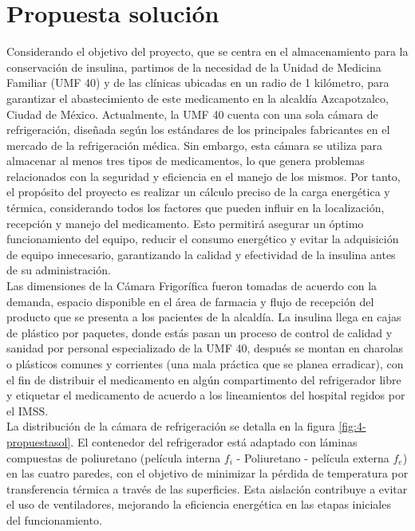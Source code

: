  
 \section{Propuesta solución}

 
Considerando el objetivo del proyecto, que se centra en el almacenamiento para la conservación de insulina, partimos de la necesidad de la Unidad de Medicina Familiar (UMF 40) y de las clínicas ubicadas en un radio de 1 kilómetro, para garantizar el abastecimiento de este medicamento en la alcaldía Azcapotzalco, Ciudad de México. Actualmente, la UMF 40 cuenta con una sola cámara de refrigeración, diseñada según los estándares de los principales fabricantes en el mercado de la refrigeración médica. Sin embargo, esta cámara se utiliza para almacenar al menos tres tipos de medicamentos, lo que genera problemas relacionados con la seguridad y eficiencia en el manejo de los mismos. Por tanto, el propósito del proyecto es realizar un cálculo preciso de la carga energética y térmica, considerando todos los factores que pueden influir en la localización, recepción y manejo del medicamento. Esto permitirá asegurar un óptimo funcionamiento del equipo, reducir el consumo energético y evitar la adquisición de equipo innecesario, garantizando la calidad y efectividad de la insulina antes de su administración.\\
Las dimensiones de la Cámara Frigorífica fueron tomadas de acuerdo con la demanda, espacio disponible en el área de farmacia y flujo de recepción del producto que se presenta a los pacientes de la alcaldía. La insulina llega en cajas de plástico por paquetes, donde estás pasan un proceso de control de calidad y sanidad por personal especializado de la UMF 40, después se montan en charolas o plásticos comunes y corrientes (una mala práctica que se planea erradicar), con el fin de distribuir el medicamento en algún compartimento del refrigerador libre y etiquetar el medicamento de acuerdo a los lineamientos del hospital regidos por el IMSS.\\
La distribución de la cámara de refrigeración se detalla en la figura \ref{fig:4-propuestasol}. El contenedor del refrigerador está adaptado con láminas compuestas de poliuretano (película interna $f_i$ - Poliuretano - película externa $f_e$) en las cuatro paredes, con el objetivo de minimizar la pérdida de temperatura por transferencia térmica a través de las superficies. Esta aislación contribuye a evitar el uso de ventiladores, mejorando la eficiencia energética en las etapas iniciales del funcionamiento.\\
